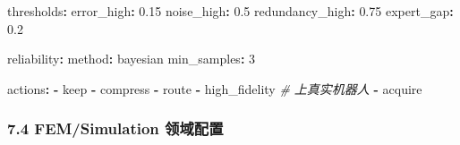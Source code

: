 \documentclass[
  12pt,
]{ctexart}
\newenvironment{Shaded}{}{}
\newcommand{\AttributeTok}[1]{\textcolor[rgb]{0.49,0.56,0.16}{#1}}
\newcommand{\CommentTok}[1]{\textcolor[rgb]{0.38,0.63,0.69}{\textit{#1}}}
\newcommand{\DecValTok}[1]{\textcolor[rgb]{0.25,0.63,0.44}{#1}}
\newcommand{\FloatTok}[1]{\textcolor[rgb]{0.25,0.63,0.44}{#1}}
\newcommand{\FunctionTok}[1]{\textcolor[rgb]{0.02,0.16,0.49}{#1}}
\newcommand{\KeywordTok}[1]{\textcolor[rgb]{0.00,0.44,0.13}{\textbf{#1}}}
\begin{document}
\begin{Shaded}
\begin{Highlighting}[]
\FunctionTok{thresholds}\KeywordTok{:}
\AttributeTok{  }\FunctionTok{error\_high}\KeywordTok{:}\AttributeTok{ }\FloatTok{0.15}
\AttributeTok{  }\FunctionTok{noise\_high}\KeywordTok{:}\AttributeTok{ }\FloatTok{0.5}
\AttributeTok{  }\FunctionTok{redundancy\_high}\KeywordTok{:}\AttributeTok{ }\FloatTok{0.75}
\AttributeTok{  }\FunctionTok{expert\_gap}\KeywordTok{:}\AttributeTok{ }\FloatTok{0.2}

\FunctionTok{reliability}\KeywordTok{:}
\AttributeTok{  }\FunctionTok{method}\KeywordTok{:}\AttributeTok{ bayesian}
\AttributeTok{  }\FunctionTok{min\_samples}\KeywordTok{:}\AttributeTok{ }\DecValTok{3}

\FunctionTok{actions}\KeywordTok{:}
\AttributeTok{  }\KeywordTok{{-}}\AttributeTok{ keep}
\AttributeTok{  }\KeywordTok{{-}}\AttributeTok{ compress}
\AttributeTok{  }\KeywordTok{{-}}\AttributeTok{ route}
\AttributeTok{  }\KeywordTok{{-}}\AttributeTok{ high\_fidelity}\CommentTok{        \# 上真实机器人}
\AttributeTok{  }\KeywordTok{{-}}\AttributeTok{ acquire}
\end{Highlighting}
\end{Shaded}

\subsubsection{7.4 FEM/Simulation
领域配置}\label{femsimulation-ux9886ux57dfux914dux7f6e}
\end{document}
